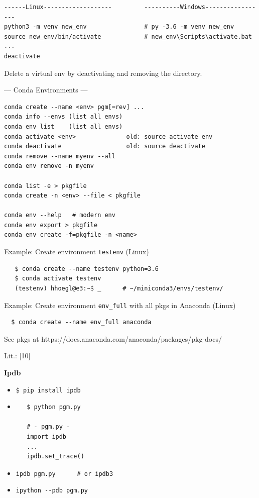 \documentclass[9pt,a4wide]{extarticle}
\begin{document}
\begin{verbatim}
------Linux-------------------         ----------Windows-----------------
python3 -m venv new_env                # py -3.6 -m venv new_env 
source new_env/bin/activate            # new_env\Scripts\activate.bat 
...
deactivate
\end{verbatim}

Delete a virtual env by deactivating and removing the directory.


--- Conda Environments ---

\begin{verbatim}
conda create --name <env> pgm[=rev] ...         
conda info --envs (list all envs)        
conda env list    (list all envs)
conda activate <env>              old: source activate env
conda deactivate                  old: source deactivate                         
conda remove --name myenv --all
conda env remove -n myenv

conda list -e > pkgfile
conda create -n <env> --file < pkgfile
                                         
conda env --help   # modern env
conda env export > pkgfile 
conda env create -f=pkgfile -n <name>
\end{verbatim}

Example: Create environment {\tt testenv} (Linux)

\begin{verbatim}
   $ conda create --name testenv python=3.6
   $ conda activate testenv
   (testenv) hhoegl@e3:~$ _      # ~/miniconda3/envs/testenv/
\end{verbatim}

Example: Create environment {\tt env\_full} with all pkgs in Anaconda (Linux)

\begin{verbatim}
  $ conda create --name env_full anaconda
\end{verbatim}

See pkgs at https://docs.anaconda.com/anaconda/packages/pkg-docs/



Lit.: [10]


\medskip
{\bf Ipdb}

\begin{itemize}
\item {\tt \$ pip install ipdb}

\item 
   \begin{verbatim}
   $ python pgm.py

   # - pgm.py -
   import ipdb
   ...
   ipdb.set_trace()
   \end{verbatim}

\item {\tt ipdb pgm.py \ \ \ \ \  \# or ipdb3}

\item {\tt ipython -{}-pdb pgm.py}

\end{itemize}
\end{document}
